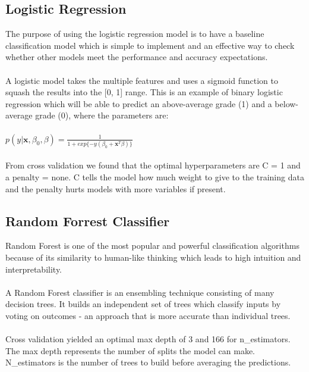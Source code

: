 \documentclass[twoside,twocolumn]{article}
\begin{document}
\subsection{Logistic Regression}
The purpose of using the logistic regression model is to have a baseline classification model which is simple to implement and an effective way to check whether other models meet the performance and accuracy expectations.
\\ \\
A logistic model takes the multiple features and uses a sigmoid function to squash the results into the [0, 1] range. This is an example of binary logistic regression which will be able to predict an above-average grade (1) and a below-average grade (0), where the parameters are:
\\ \\
$p(y|\textbf{x},\beta_{0},\beta)=\frac{1}{1+exp\{-y(\beta_{0}+\textbf{x}^T\beta)\}}$
\\ \\
From cross validation we found that the optimal hyperparameters are C = 1 and a penalty = none. C tells the model how much weight to give to the training data and the penalty hurts models with more variables if present.

\subsection{Random Forrest Classifier}
Random Forest is one of the most popular and powerful classification algorithms because of its similarity to human-like thinking which leads to high intuition and interpretability.
\\ \\
A Random Forest classifier is an ensembling technique consisting of many decision trees. It builds an independent set of trees which classify inputs by voting on outcomes - an approach that is more accurate than individual trees. 
\\ \\
Cross validation yielded an optimal max depth of 3 and 166 for n\_estimators. The max depth represents the number of splits the model can make. N\_estimators is the number of trees to build before averaging the predictions. 
\end{document}
